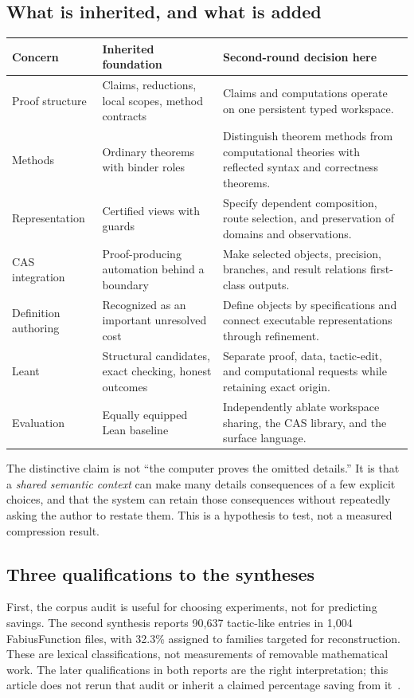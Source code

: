 \documentclass[11pt,letterpaper]{article}
\theoremstyle{definition}
\theoremstyle{remark}
\begin{document}
\subsection{What is inherited, and what is added}
\begin{tabularx}{\textwidth}{@{}P{.27\textwidth}YY@{}}
\toprule
Concern & Inherited foundation & Second-round decision here\\
\midrule
Proof structure & Claims, reductions, local scopes, method contracts & Claims and
computations operate on one persistent typed workspace.\\
Methods & Ordinary theorems with binder roles & Distinguish theorem methods from
computational theories with reflected syntax and correctness theorems.\\
Representation & Certified views with guards & Specify dependent composition,
route selection, and preservation of domains and observations.\\
CAS integration & Proof-producing automation behind a boundary & Make selected
objects, precision, branches, and result relations first-class outputs.\\
Definition authoring & Recognized as an important unresolved cost & Define objects
by specifications and connect executable representations through refinement.\\
Leant & Structural candidates, exact checking, honest outcomes & Separate proof,
data, tactic-edit, and computational requests while retaining exact origin.\\
Evaluation & Equally equipped Lean baseline & Independently ablate workspace
sharing, the CAS library, and the surface language.\\
\bottomrule
\end{tabularx}

The distinctive claim is not ``the computer proves the omitted details.'' It is
that a \emph{shared semantic context} can make many details consequences of a few
explicit choices, and that the system can retain those consequences without
repeatedly asking the author to restate them. This is a hypothesis to test, not
a measured compression result.

\subsection{Three qualifications to the syntheses}
First, the corpus audit is useful for choosing experiments, not for predicting
savings. The second synthesis reports 90,637 tactic-like entries in 1,004
FabiusFunction files, with 32.3\% assigned to families targeted for reconstruction.
These are lexical classifications, not measurements of removable mathematical
work. The later qualifications in both reports are the right interpretation;
this article does not rerun that audit or inherit a claimed percentage saving
from it~\cite{synthesis,blueprints}.
\end{document}
